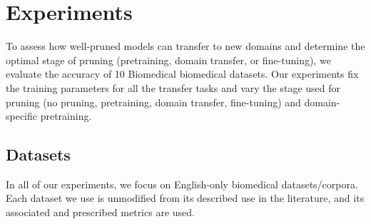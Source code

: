 \documentclass[10pt]{article}
\begin{document}
\section{Experiments}
To assess how well-pruned models can transfer to new domains and determine the optimal stage of pruning (pretraining, domain transfer, or fine-tuning), we evaluate the accuracy of 10 Biomedical biomedical datasets. Our experiments fix the training parameters for all the transfer tasks and vary the stage used for pruning (no pruning, pretraining, domain transfer, fine-tuning) and domain-specific pretraining.
\subsection{Datasets}
In all of our experiments, we focus on English-only biomedical datasets/corpora. Each dataset we use is unmodified from its described use in the literature, and its associated and prescribed metrics are used.\\
\end{document}
